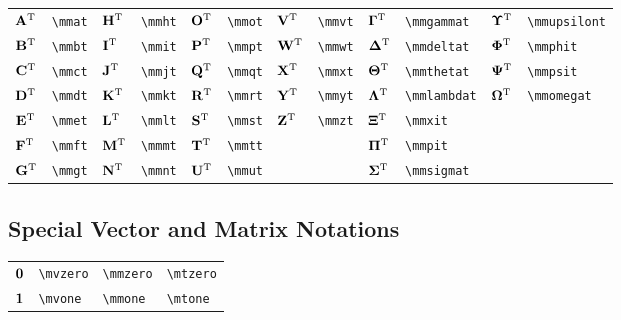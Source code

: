 \documentclass{article}
\begin{document}
\begin{tabular}{*{12}{l}}
    ${{\mathbf A}^{\mathrm T}}$ & \lstinline`\mmat` & ${{\mathbf H}^{\mathrm T}}$ & \lstinline`\mmht` & ${{\mathbf O}^{\mathrm T}}$ & \lstinline`\mmot` & ${{\mathbf V}^{\mathrm T}}$ & \lstinline`\mmvt` & ${{\bm \Gamma}^{\mathrm T}}$  & \lstinline`\mmgammat` & ${{\bm \Upsilon}^{\mathrm T}}$ & \lstinline`\mmupsilont` \\
    ${{\mathbf B}^{\mathrm T}}$ & \lstinline`\mmbt` & ${{\mathbf I}^{\mathrm T}}$ & \lstinline`\mmit` & ${{\mathbf P}^{\mathrm T}}$ & \lstinline`\mmpt` & ${{\mathbf W}^{\mathrm T}}$ & \lstinline`\mmwt` & ${{\bm \Delta}^{\mathrm T}}$  & \lstinline`\mmdeltat` & ${{\bm \Phi}^{\mathrm T}}$     & \lstinline`\mmphit` \\
    ${{\mathbf C}^{\mathrm T}}$ & \lstinline`\mmct` & ${{\mathbf J}^{\mathrm T}}$ & \lstinline`\mmjt` & ${{\mathbf Q}^{\mathrm T}}$ & \lstinline`\mmqt` & ${{\mathbf X}^{\mathrm T}}$ & \lstinline`\mmxt` & ${{\bm \Theta}^{\mathrm T}}$  & \lstinline`\mmthetat` & ${{\bm \Psi}^{\mathrm T}}$     & \lstinline`\mmpsit` \\
    ${{\mathbf D}^{\mathrm T}}$ & \lstinline`\mmdt` & ${{\mathbf K}^{\mathrm T}}$ & \lstinline`\mmkt` & ${{\mathbf R}^{\mathrm T}}$ & \lstinline`\mmrt` & ${{\mathbf Y}^{\mathrm T}}$ & \lstinline`\mmyt` & ${{\bm \Lambda}^{\mathrm T}}$ & \lstinline`\mmlambdat` & ${{\bm \Omega}^{\mathrm T}}$   & \lstinline`\mmomegat` \\
    ${{\mathbf E}^{\mathrm T}}$ & \lstinline`\mmet` & ${{\mathbf L}^{\mathrm T}}$ & \lstinline`\mmlt` & ${{\mathbf S}^{\mathrm T}}$ & \lstinline`\mmst` & ${{\mathbf Z}^{\mathrm T}}$ & \lstinline`\mmzt` & ${{\bm \Xi}^{\mathrm T}}$     & \lstinline`\mmxit` &                                          \\
    ${{\mathbf F}^{\mathrm T}}$ & \lstinline`\mmft` & ${{\mathbf M}^{\mathrm T}}$ & \lstinline`\mmmt` & ${{\mathbf T}^{\mathrm T}}$ & \lstinline`\mmtt` &         &                          & ${{\bm \Pi}^{\mathrm T}}$     & \lstinline`\mmpit` &                                          \\
    ${{\mathbf G}^{\mathrm T}}$ & \lstinline`\mmgt` & ${{\mathbf N}^{\mathrm T}}$ & \lstinline`\mmnt` & ${{\mathbf U}^{\mathrm T}}$ & \lstinline`\mmut` &         &                          & ${{\bm \Sigma}^{\mathrm T}}$  & \lstinline`\mmsigmat` &                                          \\
\end{tabular}


\subsection{Special Vector and Matrix Notations}
\begin{tabular}{*{4}{l}}
    ${\mathbf 0}$ & \lstinline`\mvzero` & \lstinline`\mmzero` & \lstinline`\mtzero` \\
    ${\mathbf 1}$  & \lstinline`\mvone` & \lstinline`\mmone` & \lstinline`\mtone` \\
\end{tabular}
\end{document}
